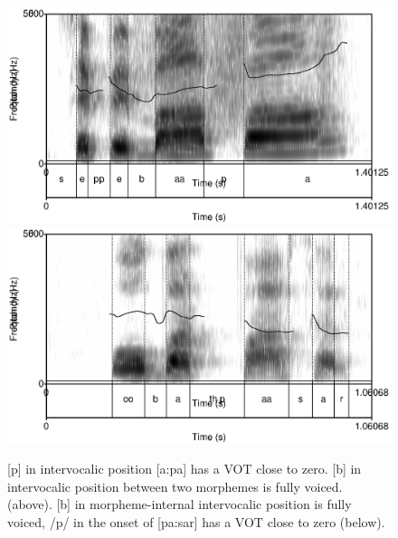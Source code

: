 \begin{figure}
 \centering
 \includegraphics[height=0.3\textheight]{./pics/seppebaapa.eps}
 \includegraphics[height=0.3\textheight]{./pics/oobathpaasar.eps}
 \caption[VOT of intervocalic /p/ and /b/]{[p] in intervocalic position [a:pa] has a VOT close to zero. [b] in intervocalic position between two morphemes is fully voiced. (above). [b] in morpheme-internal intervocalic position is fully voiced, /p/ in the onset of [pa:sar] has a VOT close to zero (below).}
 \label{fig:phon:vot:oobathpaasar}
\end{figure}



